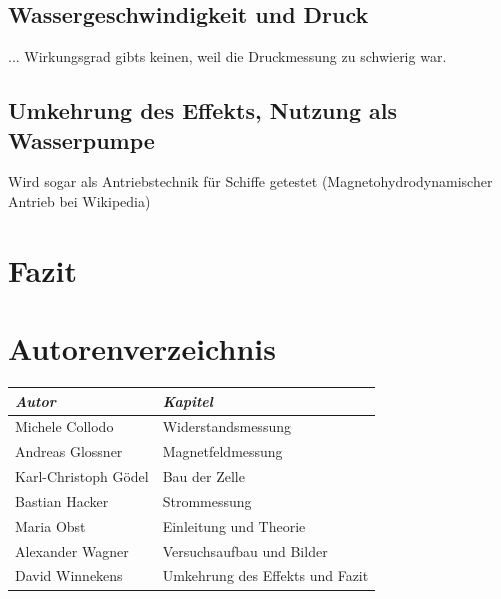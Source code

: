 \documentclass[11pt]{scrartcl}
\begin{document}
\subsection{Wassergeschwindigkeit und Druck}		%
... Wirkungsgrad gibts keinen, weil die Druckmessung zu schwierig war.

\subsection{Umkehrung des Effekts, Nutzung als Wasserpumpe}		%
Wird sogar als Antriebstechnik für Schiffe getestet (Magnetohydrodynamischer Antrieb bei Wikipedia)

\section{Fazit}		%

\newpage
\section{Autorenverzeichnis}
\begin{tabular}{|l|l|}
\hline
\emph{Autor} & \emph{Kapitel}\\
\hline
Michele Collodo & Widerstandsmessung\\
Andreas Glossner & Magnetfeldmessung\\
Karl-Christoph G\"odel & Bau der Zelle\\
Bastian Hacker & Strommessung\\
Maria Obst & Einleitung und Theorie\\
Alexander Wagner & Versuchsaufbau und Bilder\\
David Winnekens & Umkehrung des Effekts und Fazit\\
\hline
\end{tabular}
\end{document}
